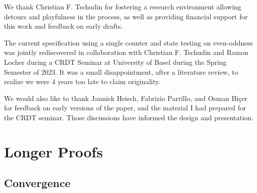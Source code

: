 \documentclass[11pt, oneside]{article}   	%
\begin{document}
We thank Christian F. Tschudin for fostering a research environment allowing detours and playfulness in the process, as well as providing financial support for this work and feedback on early drafts. 

The current specification using a single counter and state testing on even-oddness was jointly rediscovered in collaboration with Christian F. Tschudin and Ramon Locher during a CRDT Seminar at University of Basel during the Spring Semester of 2023. It was a small disappointment, after a literature review, to realize we were 4 years too late to claim originality.

We would also like to thank Jannick Heisch, Fabrizio Parrillo, and Osman Biçer for feedback on early versions of the paper, and the material I had prepared for the CRDT seminar. Those discussions have informed the design and presentation.

\newpage




\newpage
\appendix

\section{Longer Proofs}

\subsection{Convergence}
\label{sec:longer-proofs:convergence}
\end{document}
